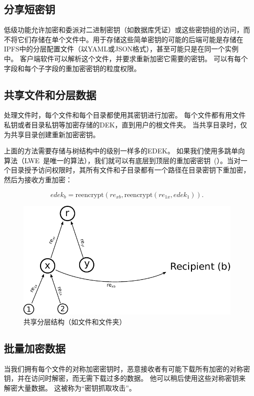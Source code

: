 \documentclass[longbibliography,nofootinbib]{revtex4-1}
\begin{document}
\subsection{分享短密钥}

低级功能允许加密和委派对二进制密钥（如数据库凭证）或这些密钥组的访问，而不将它们存储在单个文件中。用于存储这些简单密钥的可能的后端可能是存储在IPFS中的分层配置文件（以YAML或JSON格式），甚至可能只是在同一个实例中。 客户端软件可以解析这个文件，并要求重新加密它需要的密钥。 可以有每个字段和每个子字段的重加密密钥的粒度权限。

\subsection{共享文件和分层数据}
\label{sec:hierarchical-data}

	处理文件时，每个文件和每个目录都使用其密钥进行加密。 每个文件都有用文件私钥或者目录私钥等加密存储的DEK，直到用户的根文件夹。 当共享目录时，仅为共享目录创建重新加密密钥。
    
    上面的方法需要存储与树结构中的级别一样多的EDEK。 如果我们使用多跳单向算法（LWE~\cite{lwe-reencryption}是唯一的算法），我们就可以有底层到顶层的重加密密钥~(）。当对一个目录授予访问权限时，其所有文件和子目录都有一个路径在目录密钥下重加密，然后为接收方重加密：

\begin{equation}
    edek_b = \text{reencrypt}(re_{xb}, \text{reencrypt}(re_{1x}, edek_1)).
\end{equation}
\begin{figure}
\centering
    \includegraphics[width=0.45\columnwidth]{pdf/hierarchical.pdf}
    \caption{共享分层结构（如文件和文件夹）}
    \label{fig:hierarchical-pre}
\end{figure}

\subsection{批量加密数据}

	当我们拥有每个文件的对称加密密钥时，恶意接收者有可能下载所有加密的对称密钥，并在访问时解密，而无需下载过多的数据。 他可以稍后使用这些对称密钥来解密大量数据。 这被称为“密钥抓取攻击”。
    
\end{document}
